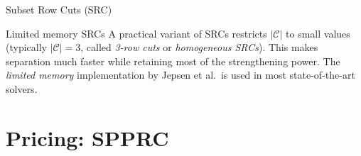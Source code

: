 \documentclass[aspectratio=169,10pt]{beamer}
\begin{document}
\begin{frame}[allowframebreaks]{Subset Row Cuts (SRC)}
\begin{block}{Limited memory SRCs}
A practical variant of SRCs restricts $|\mathcal{C}|$ to small values
(typically $|\mathcal{C}| = 3$, called \emph{3-row cuts} or
\emph{homogeneous SRCs}). This makes separation much faster while
retaining most of the strengthening power. The \emph{limited memory}
implementation by Jepsen et al.\ is used in most state-of-the-art
solvers.
\end{block}

\end{frame}

\section{Pricing: SPPRC}
\end{document}
